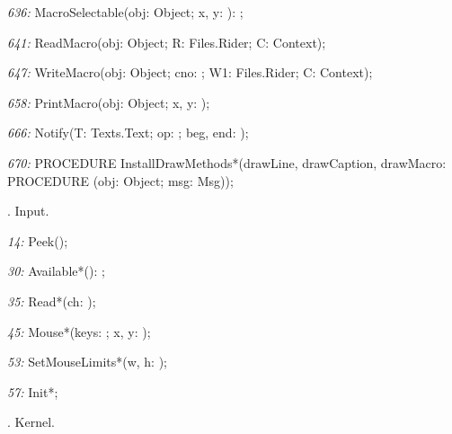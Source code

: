 \item{\it 636:} MacroSelectable(obj: Object; x, y: \INTEGER): \BOOLEAN;
\item{\it 641:} ReadMacro(obj: Object; \VAR R: Files.Rider; \VAR C: Context);
\item{\it 647:} WriteMacro(obj: Object; cno: \INTEGER; \VAR W1: Files.Rider; \VAR C: Context);
\item{\it 658:} PrintMacro(obj: Object; x, y: \INTEGER);
\item{\it 666:} Notify(T: Texts.Text; op: \INTEGER; beg, end: \LONGINT);
\item{\it 670:}  PROCEDURE InstallDrawMethods*(drawLine, drawCaption, drawMacro: PROCEDURE (obj: Object; \VAR msg: Msg));

. Input.
  
\item{\it 14:} Peek();
\item{\it 30:} Available*(): \INTEGER;
\item{\it 35:} Read*(\VAR ch: \CHAR);
\item{\it 45:} Mouse*(\VAR keys: \SET; \VAR x, y: \INTEGER);
\item{\it 53:} SetMouseLimits*(w, h: \INTEGER);
\item{\it 57:} Init*;

. Kernel.

